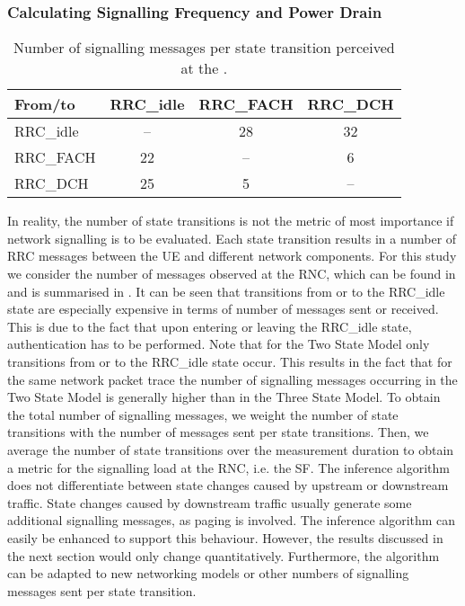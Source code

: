 \subsubsection*{Calculating Signalling Frequency and Power Drain}\label{sec:network:network_traces:calculating_metrics}

\begin{table}
\centering
  \caption{Number of signalling messages per  state transition perceived at the  \cite{3GPP_RRC_Spec}.}
  \label{tab:network:network_traces:calculating_metrics:signalling_messages}
\begin{tabular}{lccc}
	\toprule
    From/to & \gls{RRC_idle} & \gls{RRC_FACH} & \gls{RRC_DCH}\\
    \midrule
    \gls{RRC_idle} & -- & 28 & 32\\
    \gls{RRC_FACH} & 22 & -- & 6\\
    \gls{RRC_DCH} & 25 & 5 & --\\
    \bottomrule    
	\end{tabular}
\end{table}

In reality, the number of state transitions is not the metric of most importance if network signalling is to be evaluated.
Each state transition results in a number of \gls{RRC} messages between the \gls{UE} and different network components.
For this study we consider the number of messages observed at the \gls{RNC}, which can be found in \cite{3GPP_RRC_Spec} and is summarised in .
It can be seen that transitions from or to the \gls{RRC_idle} state are especially expensive in terms of number of messages sent or received.
This is due to the fact that upon entering or leaving the \gls{RRC_idle} state, authentication has to be performed. 
Note that for the Two State Model only transitions from or to the \gls{RRC_idle} state occur.
This results in the fact that for the same network packet trace the number of signalling messages occurring in the Two State Model is generally higher than in the Three State Model.
To obtain the total number of signalling messages, we weight the number of state transitions with the number of messages sent per state transitions.
Then, we average the number of state transitions over the measurement duration to obtain a metric for the signalling load at the \gls{RNC}, i.e. the \gls{SF}.
The inference algorithm does not differentiate between state changes caused by upstream or downstream traffic.
State changes caused by downstream traffic usually generate some additional signalling messages, as paging is involved.
The inference algorithm can easily be enhanced to support this behaviour.
However, the results discussed in the next section would only change quantitatively.
Furthermore, the algorithm can be adapted to new networking models or other numbers of signalling messages sent per state transition.

